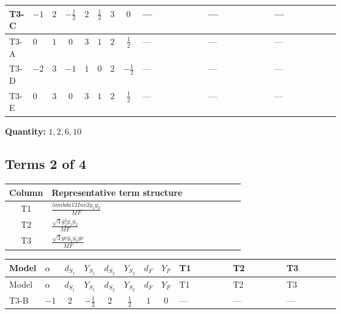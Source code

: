 \documentclass[8pt]{article}
\begin{document}
\begin{landscape}
\begin{longtable}{@{}llcccccc >{\raggedright\arraybackslash}p{0.21\linewidth} >{\raggedright\arraybackslash}p{0.21\linewidth} >{\raggedright\arraybackslash}p{0.21\linewidth}@{}}
\midrule
T3-C & $-1$ & $2$ & $-\frac{1}{2}$ & $2$ & $\frac{1}{2}$ & $3$ & $0$ & --- & --- & --- \\
\midrule
T3-A & $0$ & $1$ & $0$ & $3$ & $1$ & $2$ & $\frac{1}{2}$ & --- & --- & --- \\
\midrule
T3-D & $-2$ & $3$ & $-1$ & $1$ & $0$ & $2$ & $-\frac{1}{2}$ & --- & --- & --- \\
\midrule
T3-E & $0$ & $3$ & $0$ & $3$ & $1$ & $2$ & $\frac{1}{2}$ & --- & --- & --- \\
\midrule
\bottomrule
\end{longtable}
\clearpage
\noindent\textbf{Quantity: }$\mathrm{1,2,6,10}$\par\smallskip
\subsection*{Terms 2 of 4}
\begin{center}
\begin{tabular}{@{}c >{\raggedright\arraybackslash}p{0.82\linewidth}@{}}
\toprule
Column & Representative term structure \\
\midrule
T1 & \(\displaystyle \frac{lambda12Inv2 \overline{y_{1}} \overline{y_{2}}}{MF}\) \\
\midrule
T2 & \(\displaystyle \frac{\sqrt{3} g_{2}^{2} \overline{y_{1}} \overline{y_{2}}}{MF}\) \\
\midrule
T3 & \(\displaystyle \frac{\sqrt{3} ye \overline{y_{1}} \overline{y_{2}} \overline{ye}}{MF}\) \\
\midrule
\bottomrule
\end{tabular}
\end{center}
\smallskip
\tiny
\begin{longtable}{@{}llcccccc >{\raggedright\arraybackslash}p{0.21\linewidth} >{\raggedright\arraybackslash}p{0.21\linewidth} >{\raggedright\arraybackslash}p{0.21\linewidth}@{}}
\toprule
Model & $\alpha$ & $d_{S_1}$ & $Y_{S_1}$ & $d_{S_2}$ & $Y_{S_2}$ & $d_F$ & $Y_F$ & T1 & T2 & T3 \\
\midrule
\endfirsthead
\toprule
Model & $\alpha$ & $d_{S_1}$ & $Y_{S_1}$ & $d_{S_2}$ & $Y_{S_2}$ & $d_F$ & $Y_F$ & T1 & T2 & T3 \\
\midrule
\endhead
T3-B & $-1$ & $2$ & $-\frac{1}{2}$ & $2$ & $\frac{1}{2}$ & $1$ & $0$ & --- & --- & --- \\
\midrule

\end{longtable}
\end{landscape}
\end{document}
